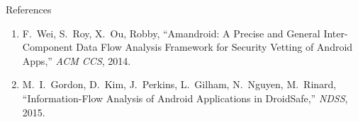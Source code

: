 \documentclass[aspectratio=169]{beamer}
\begin{document}
\begin{frame}[allowframebreaks]{References}
\begin{enumerate}
    \item F.\ Wei, S.\ Roy, X.\ Ou, Robby,
          ``Amandroid: A Precise and General Inter-Component Data Flow Analysis
          Framework for Security Vetting of Android Apps,''
          \textit{ACM CCS}, 2014.

    \item M.\ I.\ Gordon, D.\ Kim, J.\ Perkins, L.\ Gilham, N.\ Nguyen, M.\ Rinard,
          ``Information-Flow Analysis of Android Applications in DroidSafe,''
          \textit{NDSS}, 2015.
\end{enumerate}
\end{frame}


\end{document}
